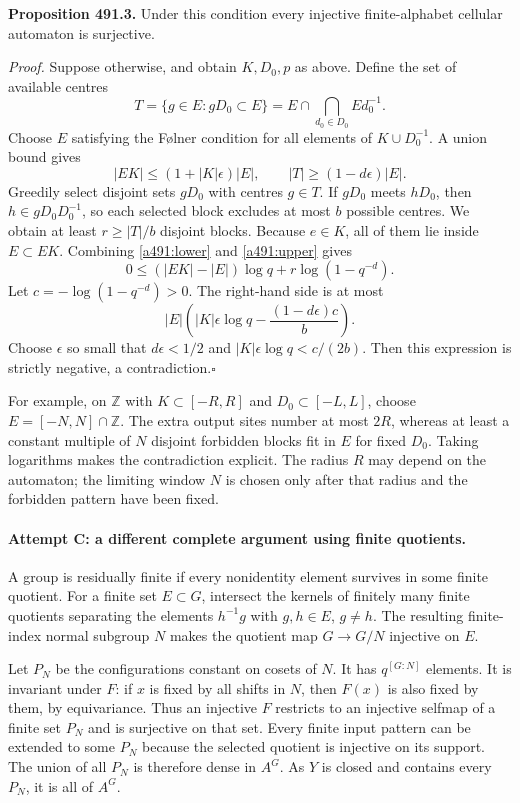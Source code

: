 \documentclass[11pt]{article}
\begin{document}
\textbf{Proposition 491.3.} Under this condition every injective finite-alphabet
cellular automaton is surjective.

\emph{Proof.} Suppose otherwise, and obtain $K,D_0,p$ as above. Define the
set of available centres
\[
 T=\{g\in E:gD_0\subset E\}
    =E\cap\bigcap_{d_0\in D_0}Ed_0^{-1}.
\]
Choose $E$ satisfying the F\o lner condition for all elements of
$K\cup D_0^{-1}$. A union bound gives
\[
 |EK|\le(1+|K|\epsilon)|E|,
 \qquad |T|\ge(1-d\epsilon)|E|.
\]
Greedily select disjoint sets $gD_0$ with centres $g\in T$. If $gD_0$
meets $hD_0$, then $h\in gD_0D_0^{-1}$, so each selected block excludes
at most $b$ possible centres. We obtain at least $r\ge |T|/b$ disjoint
blocks. Because $e\in K$, all of them lie inside $E\subset EK$.
Combining \eqref{a491:lower} and \eqref{a491:upper} gives
\[
 0\le (|EK|-|E|)\log q+r\log(1-q^{-d}).
\]
Let $c=-\log(1-q^{-d})>0$. The right-hand side is at most
\begin{equation}\label{a491:contradiction}
 |E|\left(|K|\epsilon\log q
                -\frac{(1-d\epsilon)c}{b}\right).
\end{equation}
Choose $\epsilon$ so small that $d\epsilon<1/2$ and
$|K|\epsilon\log q<c/(2b)$. Then this expression is strictly negative,
a contradiction.\hfill$\square$

For example, on $\mathbb Z$ with $K\subset[-R,R]$ and
$D_0\subset[-L,L]$, choose $E=[-N,N]\cap\mathbb Z$.
The extra output sites number at most $2R$, whereas at least a constant
multiple of $N$ disjoint forbidden blocks fit in $E$ for fixed $D_0$.
Taking logarithms makes the contradiction explicit. The radius $R$ may
depend on the automaton; the limiting window $N$ is chosen only after
that radius and the forbidden pattern have been fixed.

\paragraph{Attempt C: a different complete argument using finite quotients.}
A group is residually finite if every nonidentity element survives in
some finite quotient. For a finite set $E\subset G$, intersect the kernels
of finitely many finite quotients separating the elements $h^{-1}g$ with
$g,h\in E$, $g\ne h$. The resulting finite-index normal subgroup $N$
makes the quotient map $G\to G/N$ injective on $E$.

Let $P_N$ be the configurations constant on cosets of $N$. It has
$q^{[G:N]}$ elements. It is invariant under $F$: if $x$ is fixed by
all shifts in $N$, then $F(x)$ is also fixed by them, by equivariance.
Thus an injective $F$ restricts to an injective selfmap of a finite
set $P_N$ and is surjective on that set. Every finite input pattern can
be extended to some $P_N$ because the selected quotient is injective
on its support. The union of all $P_N$ is therefore dense in $A^G$.
As $Y$ is closed and contains every $P_N$, it is all of $A^G$.
\end{document}
